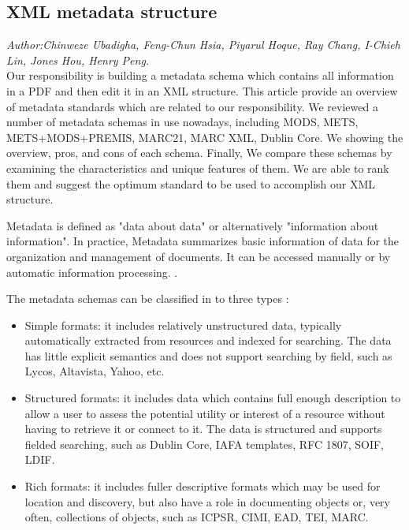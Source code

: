 % 
% 
\subsection{XML metadata structure}
\textit{\footnotesize Author:Chinweze Ubadigha, Feng-Chun Hsia, Piyarul Hoque, Ray Chang, I-Chieh Lin, Jones Hou, Henry Peng.}\label{sec:abs}\\

Our responsibility is building a metadata schema which contains all information in a PDF and then edit it in an XML structure. This article provide an overview of metadata standards which are related to our responsibility. We reviewed a number of metadata schemas in use nowadays, including MODS, METS, METS+MODS+PREMIS, MARC21, MARC XML, Dublin Core. We showing the overview, pros, and cons of each schema. Finally, We compare these schemas by examining the characteristics and unique features of them. We are able to rank them and suggest the optimum standard to be used to accomplish our XML structure.

Metadata is defined as "data about data" or alternatively "information about information". In practice, Metadata summarizes basic information of data for the organization and management of documents. It can be accessed manually or by automatic information processing. \cite{underwood2003xml}.

The metadata schemas can be classified in to three types \cite{dempsey1997specification}:
\begin{itemize}
	\item Simple formats: it includes relatively unstructured data, typically automatically extracted from resources and indexed for searching. The data has little explicit semantics and does not support searching by field, such as Lycos, Altavista, Yahoo, etc.
	\item Structured formats: it includes data which contains full enough description to allow a user to assess the potential utility or interest of a resource without having to retrieve it or connect to it. The data is structured and supports fielded searching, such as Dublin Core, IAFA templates, RFC 1807, SOIF, LDIF.
	\item Rich formats: it includes fuller descriptive formats which may be used for location and discovery, but also have a role in documenting objects or, very often, collections of objects, such as ICPSR, CIMI, EAD, TEI, MARC.
\end{itemize}

